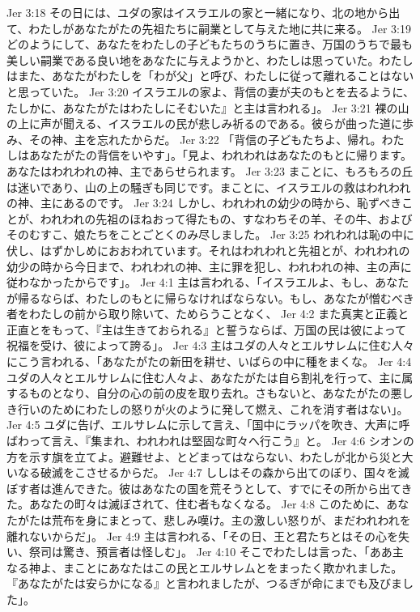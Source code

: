 Jer 3:18  その日には、ユダの家はイスラエルの家と一緒になり、北の地から出て、わたしがあなたがたの先祖たちに嗣業として与えた地に共に来る。
Jer 3:19  どのようにして、あなたをわたしの子どもたちのうちに置き、万国のうちで最も美しい嗣業である良い地をあなたに与えようかと、わたしは思っていた。わたしはまた、あなたがわたしを「わが父」と呼び、わたしに従って離れることはないと思っていた。
Jer 3:20  イスラエルの家よ、背信の妻が夫のもとを去るように、たしかに、あなたがたはわたしにそむいた』と主は言われる」。
Jer 3:21  裸の山の上に声が聞える、イスラエルの民が悲しみ祈るのである。彼らが曲った道に歩み、その神、主を忘れたからだ。
Jer 3:22  「背信の子どもたちよ、帰れ。わたしはあなたがたの背信をいやす」。「見よ、われわれはあなたのもとに帰ります。あなたはわれわれの神、主であらせられます。
Jer 3:23  まことに、もろもろの丘は迷いであり、山の上の騒ぎも同じです。まことに、イスラエルの救はわれわれの神、主にあるのです。
Jer 3:24  しかし、われわれの幼少の時から、恥ずべきことが、われわれの先祖のほねおって得たもの、すなわちその羊、その牛、およびそのむすこ、娘たちをことごとくのみ尽しました。
Jer 3:25  われわれは恥の中に伏し、はずかしめにおおわれています。それはわれわれと先祖とが、われわれの幼少の時から今日まで、われわれの神、主に罪を犯し、われわれの神、主の声に従わなかったからです」。
Jer 4:1  主は言われる、「イスラエルよ、もし、あなたが帰るならば、わたしのもとに帰らなければならない。もし、あなたが憎むべき者をわたしの前から取り除いて、ためらうことなく、
Jer 4:2  また真実と正義と正直とをもって、『主は生きておられる』と誓うならば、万国の民は彼によって祝福を受け、彼によって誇る」。
Jer 4:3  主はユダの人々とエルサレムに住む人々にこう言われる、「あなたがたの新田を耕せ、いばらの中に種をまくな。
Jer 4:4  ユダの人々とエルサレムに住む人々よ、あなたがたは自ら割礼を行って、主に属するものとなり、自分の心の前の皮を取り去れ。さもないと、あなたがたの悪しき行いのためにわたしの怒りが火のように発して燃え、これを消す者はない」。
Jer 4:5  ユダに告げ、エルサレムに示して言え、「国中にラッパを吹き、大声に呼ばわって言え、『集まれ、われわれは堅固な町々へ行こう』と。
Jer 4:6  シオンの方を示す旗を立てよ。避難せよ、とどまってはならない、わたしが北から災と大いなる破滅をこさせるからだ。
Jer 4:7  ししはその森から出てのぼり、国々を滅ぼす者は進んできた。彼はあなたの国を荒そうとして、すでにその所から出てきた。あなたの町々は滅ぼされて、住む者もなくなる。
Jer 4:8  このために、あなたがたは荒布を身にまとって、悲しみ嘆け。主の激しい怒りが、まだわれわれを離れないからだ」。
Jer 4:9  主は言われる、「その日、王と君たちとはその心を失い、祭司は驚き、預言者は怪しむ」。
Jer 4:10  そこでわたしは言った、「ああ主なる神よ、まことにあなたはこの民とエルサレムとをまったく欺かれました。『あなたがたは安らかになる』と言われましたが、つるぎが命にまでも及びました」。
